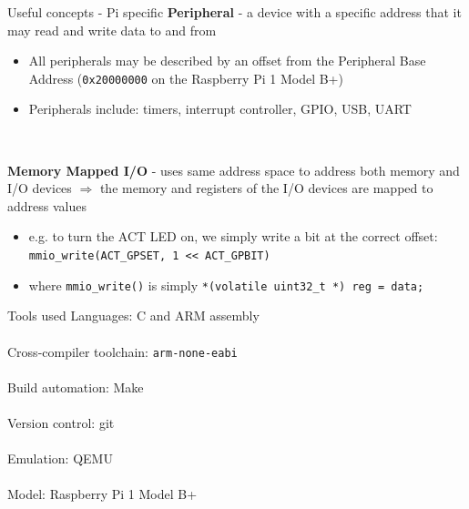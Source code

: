 \documentclass[10pt]{beamer}
\newcommand{\code}[1]{\texttt{#1}}
\begin{document}
\begin{frame}{Useful concepts - Pi specific}
    \textbf{Peripheral} - a device with a specific address that it may read and write data to and from
    \begin{itemize}
        \item All peripherals may be described by an offset from the Peripheral Base Address (\code{0x20000000} on the Raspberry Pi 1 Model B+)
        \item Peripherals include: timers, interrupt controller, GPIO, USB, UART
    \end{itemize} ~

    \textbf{Memory Mapped I/O} - uses same address space to address both memory and I/O devices $\Rightarrow$ the memory and registers of the I/O devices are mapped to address values
    \begin{itemize}
        \item e.g. to turn the ACT LED on, we simply write a bit at the correct offset: \code{mmio\_write(ACT\_GPSET, 1 << ACT\_GPBIT)}
        \item where \code{mmio\_write()} is simply \code{*(volatile uint32\_t *) reg = data;}
    \end{itemize}
\end{frame}

\begin{frame}{Tools used}
    Languages: C and ARM assembly \\~\\
    Cross-compiler toolchain: \texttt{arm-none-eabi} \\~\\
    Build automation: Make \\~\\
    Version control: git \\~\\
    Emulation: QEMU \\~\\
    Model: Raspberry Pi 1 Model B+
\end{frame}
\end{document}
